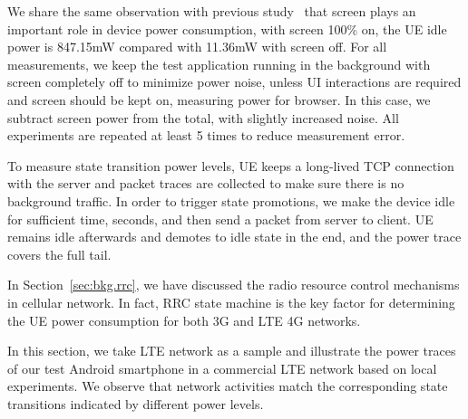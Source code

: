 We share the same observation with previous study~\cite{codes.powertutor} that screen plays an important role in device power consumption, \ie with screen 100\% on, the UE idle power is 847.15mW compared with 11.36mW with screen off. For all measurements, we keep the test application running in the background with screen completely off to minimize power noise, unless UI interactions are required and screen should be kept on, \ie measuring power for browser. In this case, we subtract screen power from the total, with slightly increased noise. All experiments are repeated at least 5 times to reduce measurement error.

To measure state transition power levels, UE keeps a long-lived TCP connection with the server and packet traces are collected to make sure there is no background traffic. In order to trigger state promotions, we make the device idle for sufficient time,  seconds, and then send a packet from server to client. UE remains idle afterwards and demotes to idle state in the end, and the power trace covers the full tail.


In Section~\ref{sec:bkg.rrc}, we have discussed the radio resource control mechanisms in cellular network. In fact, RRC state machine is the key factor for determining the UE power consumption for both 3G and LTE 4G networks.

In this section, we take LTE network as a sample and illustrate the power traces of our test Android smartphone in a commercial LTE network based on local experiments. We observe that network activities match the corresponding state transitions indicated by different power levels.

\begin{figure}[t]
\centering
{} \\
\label{fig:power.trace.all}
\end{figure}


